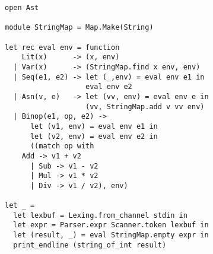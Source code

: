 \documentclass[twocolumn]{article}
\begin{document}
\begin{enumerate}
\begin{lstlisting}
open Ast

module StringMap = Map.Make(String)  

let rec eval env = function 
    Lit(x)      -> (x, env)
  | Var(x)      -> (StringMap.find x env, env)
  | Seq(e1, e2) -> let (_,env) = eval env e1 in
                   eval env e2
  | Asn(v, e)   -> let (vv, env) = eval env e in
                   (vv, StringMap.add v vv env)
  | Binop(e1, op, e2) ->
      let (v1, env) = eval env e1 in
      let (v2, env) = eval env e2 in
      ((match op with
	Add -> v1 + v2
      | Sub -> v1 - v2
      | Mul -> v1 * v2
      | Div -> v1 / v2), env)

let _ =
  let lexbuf = Lexing.from_channel stdin in
  let expr = Parser.expr Scanner.token lexbuf in
  let (result, _) = eval StringMap.empty expr in
  print_endline (string_of_int result)
\end{lstlisting}

\end{enumerate}
\end{document}
